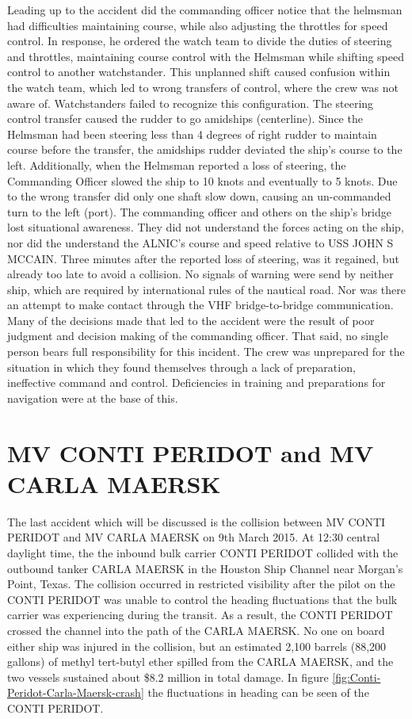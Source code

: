 Leading up to the accident did the commanding officer notice that the helmsman had difficulties maintaining course, while also adjusting the throttles for speed control. In response, he ordered the watch team to divide the duties of steering and throttles, maintaining course control with the Helmsman while shifting speed control to another watchstander. This unplanned shift caused confusion within the watch team, which led to wrong transfers of control, where the crew was not aware of. 
Watchstanders failed to recognize this configuration. The steering control transfer caused the rudder to go amidships (centerline). Since the Helmsman had been steering less than 4 degrees of right rudder to maintain course before the transfer, the amidships rudder deviated the ship’s course to the left. Additionally, when the Helmsman reported a loss of steering, the Commanding Officer slowed the ship to 10 knots and eventually to 5 knots. Due to the wrong transfer did only one shaft slow down, causing an un-commanded turn to the left (port). The commanding officer and others on the ship's bridge lost situational awareness. They did not understand the forces acting on the ship, nor did the understand the ALNIC's course and speed relative to USS JOHN S MCCAIN. Three minutes after the reported loss of steering, was it regained, but already too late to avoid a collision. No signals of warning were send by neither ship, which are required by international rules of the nautical road. Nor was there an attempt to make contact through the \ac{VHF} bridge-to-bridge communication.
Many of the decisions made that led to the accident were the result of poor judgment and decision making of the commanding officer. That said, no single person bears full responsibility for this incident. The crew was unprepared for the situation in which they found themselves through a lack of preparation, ineffective command and control. Deficiencies in training and preparations for navigation were at the base of this. \cite{USNavy2017}

\section{MV CONTI PERIDOT and MV CARLA MAERSK}
The last accident which will be discussed is the collision between MV CONTI PERIDOT and MV CARLA MAERSK on 9th March 2015. At 12:30 central daylight time, the the inbound bulk carrier CONTI PERIDOT collided with the outbound tanker CARLA MAERSK in the Houston Ship Channel near Morgan’s Point, Texas. The collision occurred in restricted visibility after the pilot on the CONTI PERIDOT was unable to control the heading fluctuations that the bulk carrier was experiencing during the transit. As a result, the CONTI PERIDOT crossed the channel into the path of the CARLA MAERSK. No one on board either ship was injured in the collision, but an estimated 2,100 barrels (88,200 gallons) of methyl tert-butyl ether spilled from the CARLA MAERSK, and the two vessels sustained about \$8.2 million in total damage. In figure \ref{fig:Conti-Peridot-Carla-Maersk-crash} the fluctuations in heading can be seen of the CONTI PERIDOT. 

